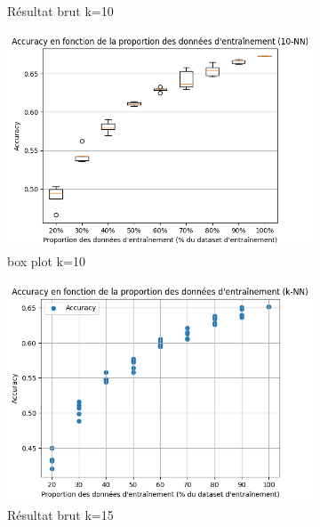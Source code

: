 \documentclass[12pt]{article}
\begin{document}
\begin{figure}[H]
\begin{subfigure}[t]{0.35\textwidth}
        \caption{Résultat brut k=10}
    \end{subfigure}
    \hfill
    \begin{subfigure}[t]{0.35\textwidth}
        \centering
        \includegraphics[width=\textwidth]{static/knn_cam_10.png}
        \caption{box plot k=10}
    \end{subfigure}
    \hfill
    \begin{subfigure}[t]{0.35\textwidth}
        \centering
        \includegraphics[width=\textwidth]{static/knn_cam_15_raw.png}
        \caption{Résultat brut k=15}
    \end{subfigure}
    \hfill
    \begin{subfigure}[t]{0.35\textwidth}
        \centering

\end{subfigure}
\end{figure}
\end{document}
